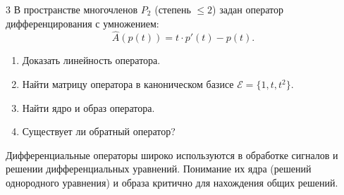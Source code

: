 \documentclass[12pt,a4paper]{article}
\theoremstyle{plain}
\theoremstyle{definition}
\begin{document}
\begin{taskbox}{3}
    В пространстве многочленов $P_2$ (степень $\le 2$) задан оператор дифференцирования с умножением:
    \[
    \hat{A}(p(t)) = t \cdot p'(t) - p(t).
    \]
    \begin{enumerate}
        \item Доказать линейность оператора.
        \item Найти матрицу оператора в каноническом базисе $\mathcal{E} = \{1, t, t^2\}$.
        \item Найти ядро и образ оператора.
        \item Существует ли обратный оператор?
    \end{enumerate}
\end{taskbox}

\begin{itbox}
    Дифференциальные операторы широко используются в обработке сигналов и решении дифференциальных уравнений. Понимание их ядра (решений однородного уравнения) и образа критично для нахождения общих решений.
\end{itbox}
\end{document}
